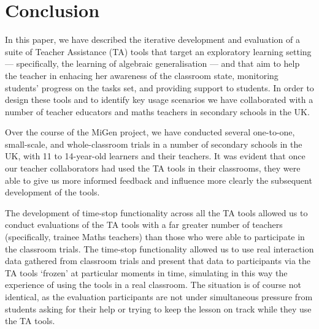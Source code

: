 \section{Conclusion}
\label{sec:conclusion}

In this paper, we have described the iterative development and evaluation of a suite
of Teacher Assistance (TA) tools that target an exploratory learning setting ---
specifically, the learning of algebraic generalisation --- and
that aim to help the teacher in enhacing her awareness of the classroom state, 
monitoring students' progress on the tasks set, and providing support to students. 
In order to design these tools and to identify key usage scenarios 
we have collaborated with a number of teacher educators and 
maths teachers in secondary schools in the UK. 

Over the course of the MiGen project, we have conducted several one-to-one, 
small-scale, and whole-classroom trials in a number of secondary
schools in the UK, with 11 to 14-year-old learners and their teachers. 
It was evident that once our teacher collaborators had used the TA tools in their
classrooms, they were able to give us more informed feedback and
influence more clearly the subsequent development of the tools. 

The development of time-stop functionality across all the TA tools 
allowed us to conduct evaluations of the TA tools with a far greater
number of teachers (specifically, trainee Maths teachers) 
than those who were able to participate in the classroom trials. 
The time-stop functionality allowed us to use real interaction data 
gathered from classroom trials and present that data to participants
via the TA tools `frozen' at particular moments in time,  
simulating in this way the experience of using the tools in a real classroom. 
The situation is of course not identical, as the evaluation participants
are not under simultaneous pressure from students asking for their help 
or trying to keep the lesson on track while they use the TA tools. 



